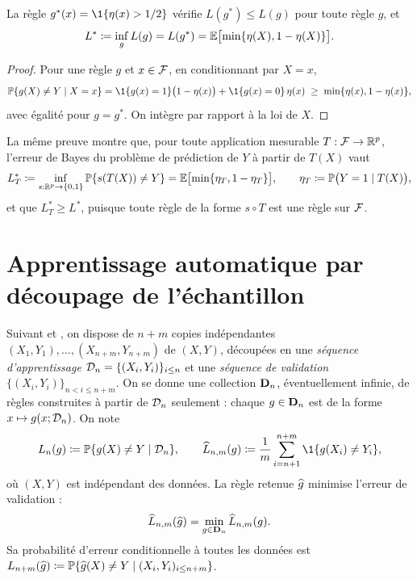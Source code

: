 \begin{proposition}\label{prop-bayes}
La règle $g^*(x)=\1\{\eta(x)>1/2\}$ vérifie $L(g^*)\le L(g)$ pour toute règle $g$, et
\[
  L^* \coloneqq \inf_{g} L(g) = L(g^*) = \mathbb{E}\bigl[\min\{\eta(X),1-\eta(X)\}\bigr].
\]
\end{proposition}

\begin{proof}
Pour une règle $g$ et $x\in\mathcal{F}$, en conditionnant par $X=x$,
\[
  \PP\{g(X)\neq Y\mid X=x\} = \1\{g(x)=1\}\bigl(1-\eta(x)\bigr) + \1\{g(x)=0\}\,\eta(x) \;\ge\; \min\{\eta(x),1-\eta(x)\},
\]
avec égalité pour $g=g^*$. On intègre par rapport à la loi de $X$.
\end{proof}

La même preuve montre que, pour toute application mesurable $T:\mathcal{F}\to\mathbb{R}^p$, l'erreur de Bayes du problème de prédiction de $Y$ à partir de $T(X)$ vaut
\begin{equation}\label{eq-bayes-T}
  L^*_{T} \coloneqq \inf_{s:\mathbb{R}^p\to\{0,1\}}\mathbb{P}\{s(T(X))\neq Y\} = \mathbb{E}\bigl[\min\{\eta_T,1-\eta_T\}\bigr],
  \qquad \eta_T\coloneqq\mathbb{P}\bigl(Y=1\mid T(X)\bigr),
\end{equation}
et que $L^*_T\ge L^*$, puisque toute règle de la forme $s\circ T$ est une règle sur $\mathcal{F}$.

\section{Apprentissage automatique par découpage de l'échantillon}\label{sec-decoupage}

Suivant \citet{devroye1988automatic} et \citet{berlinet2008functional}, on dispose de $n+m$ copies indépendantes $(X_1,Y_1),\dots,(X_{n+m},Y_{n+m})$ de $(X,Y)$, découpées en une \emph{séquence d'apprentissage} $\mathcal{D}_n=\{(X_i,Y_i)\}_{i\le n}$ et une \emph{séquence de validation} $\{(X_i,Y_i)\}_{n<i\le n+m}$. On se donne une collection $\mathbf{D}_n$, éventuellement infinie, de règles construites à partir de $\mathcal{D}_n$ seulement : chaque $g\in\mathbf{D}_n$ est de la forme $x\mapsto g(x;\mathcal{D}_n)$. On note
\[
  L_n(g)\eqdef\PP\{g(X)\neq Y\mid \Dn\},
  \qquad
  \hL_{n,m}(g)\eqdef\frac1m\sum_{i=n+1}^{n+m}\1\{g(X_i)\neq Y_i\},
\]
où $(X,Y)$ est indépendant des données. La règle retenue $\widehat{g}$ minimise l'erreur de validation :
\begin{equation}\label{eq-erm}
  \widehat{L}_{n,m}(\widehat{g}) = \min_{g\in\mathbf{D}_n}\widehat{L}_{n,m}(g).
\end{equation}
Sa probabilité d'erreur conditionnelle à toutes les données est $L_{n+m}(\widehat{g})\coloneqq\mathbb{P}\{\widehat{g}(X)\neq Y\mid (X_i,Y_i)_{i\le n+m}\}$.

